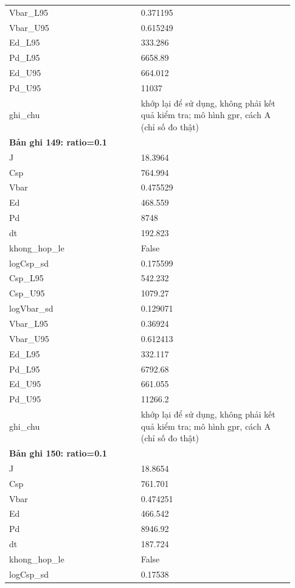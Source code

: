 \begin{longtable}{p{0.43\linewidth}p{0.50\linewidth}}
Vbar\_\allowbreak L95 & 0.371195 \\
Vbar\_\allowbreak U95 & 0.615249 \\
Ed\_\allowbreak L95 & 333.286 \\
Pd\_\allowbreak L95 & 6658.89 \\
Ed\_\allowbreak U95 & 664.012 \\
Pd\_\allowbreak U95 & 11037 \\
ghi\_\allowbreak chu & khớp lại để sử dụng, không phải kết quả kiểm tra; mô hình gpr, cách A (chỉ số đo thật) \\
\midrule
\multicolumn{2}{p{0.95\linewidth}}{\textbf{Bản ghi 149: ratio=0.1}} \\
J & 18.3964 \\
Csp & 764.994 \\
Vbar & 0.475529 \\
Ed & 468.559 \\
Pd & 8748 \\
dt & 192.823 \\
khong\_\allowbreak hop\_\allowbreak le & False \\
logCsp\_\allowbreak sd & 0.175599 \\
Csp\_\allowbreak L95 & 542.232 \\
Csp\_\allowbreak U95 & 1079.27 \\
logVbar\_\allowbreak sd & 0.129071 \\
Vbar\_\allowbreak L95 & 0.36924 \\
Vbar\_\allowbreak U95 & 0.612413 \\
Ed\_\allowbreak L95 & 332.117 \\
Pd\_\allowbreak L95 & 6792.68 \\
Ed\_\allowbreak U95 & 661.055 \\
Pd\_\allowbreak U95 & 11266.2 \\
ghi\_\allowbreak chu & khớp lại để sử dụng, không phải kết quả kiểm tra; mô hình gpr, cách A (chỉ số đo thật) \\
\midrule
\multicolumn{2}{p{0.95\linewidth}}{\textbf{Bản ghi 150: ratio=0.1}} \\
J & 18.8654 \\
Csp & 761.701 \\
Vbar & 0.474251 \\
Ed & 466.542 \\
Pd & 8946.92 \\
dt & 187.724 \\
khong\_\allowbreak hop\_\allowbreak le & False \\
logCsp\_\allowbreak sd & 0.17538 \\

\end{longtable}
